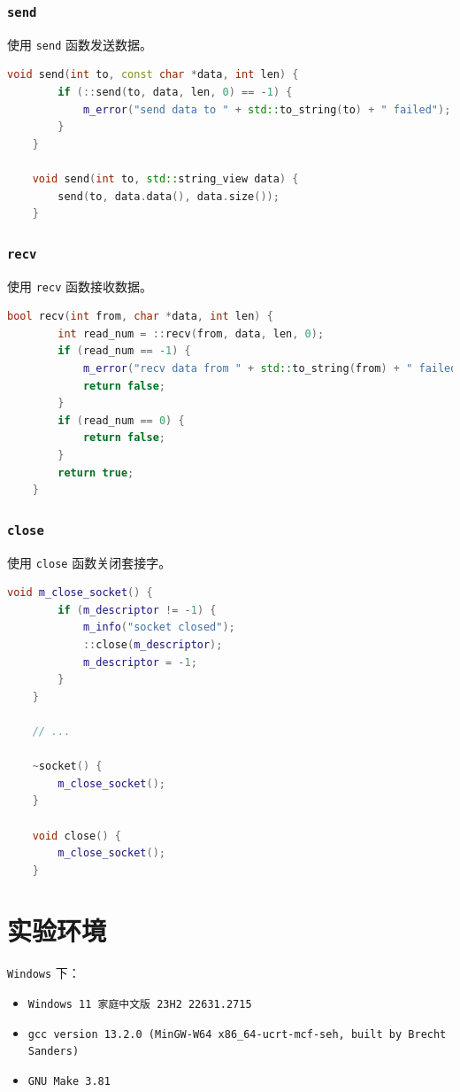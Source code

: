 \documentclass{article}
\begin{document}
\subsubsection{\texttt{send}}

使用 \texttt{send} 函数发送数据。

\begin{lstlisting}[language=C++, title=send]
    void send(int to, const char *data, int len) {
        if (::send(to, data, len, 0) == -1) {
            m_error("send data to " + std::to_string(to) + " failed");
        }
    }

    void send(int to, std::string_view data) {
        send(to, data.data(), data.size());
    }
\end{lstlisting}

\subsubsection{\texttt{recv}}

使用 \texttt{recv} 函数接收数据。

\begin{lstlisting}[language=C++, title=recv]
    bool recv(int from, char *data, int len) {
        int read_num = ::recv(from, data, len, 0);
        if (read_num == -1) {
            m_error("recv data from " + std::to_string(from) + " failed");
            return false;
        }
        if (read_num == 0) {
            return false;
        }
        return true;
    }
\end{lstlisting}

\subsubsection{\texttt{close}}

使用 \texttt{close} 函数关闭套接字。

\begin{lstlisting}[language=C++, title=close]
    void m_close_socket() {
        if (m_descriptor != -1) {
            m_info("socket closed");
            ::close(m_descriptor);
            m_descriptor = -1;
        }
    }

    // ...

    ~socket() {
        m_close_socket();
    }

    void close() {
        m_close_socket();
    }
\end{lstlisting}

\section{实验环境}
\texttt{Windows} 下：
\begin{itemize}[noitemsep]
    \item \texttt{Windows 11 家庭中文版 23H2 22631.2715}
    \item \texttt{gcc version 13.2.0 (MinGW-W64 x86\_64-ucrt-mcf-seh, built by Brecht Sanders)}
    \item \texttt{GNU Make 3.81}
\end{itemize}
\end{document}
